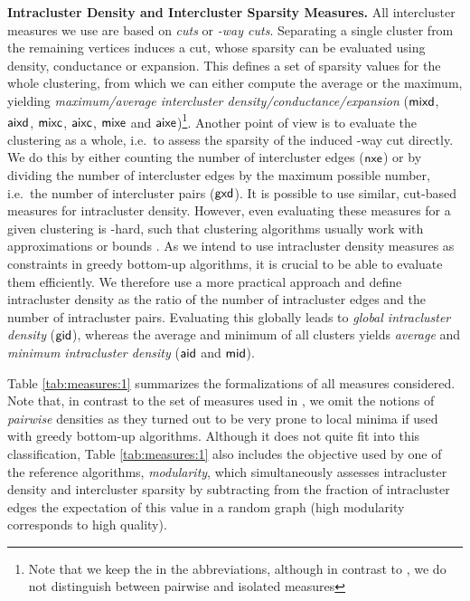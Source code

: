 \documentclass{llncs}
\newcommand{\measure}[1]{\ensuremath{\text{\normalfont{\sffamily {#1}}}}\xspace}
\newcommand{\andreapar}{\vspace*{.5ex}\par\noindent}
\begin{document}
\andreapar\textbf{Intracluster Density and Intercluster Sparsity Measures.}
All intercluster measures we use are based on \emph{cuts} or \emph{-way cuts}. 
Separating a single cluster from the remaining vertices induces a cut, 
whose sparsity can be evaluated using density, conductance or expansion.
This defines a set of sparsity values for the whole clustering, from which we can either compute the average or the maximum, yielding \emph{maximum/average intercluster density/conductance/expansion} (\measure{mixd}, \measure{aixd}, \measure{mixc}, \measure{aixc}, \measure{mixe} and \measure{aixe})\footnote{Note that we keep the  in the abbreviations, although in contrast to \cite{gsw-dcgc-11b}, we do not distinguish between pairwise and isolated measures}.
Another point of view is to evaluate the clustering as a whole, i.e.~to assess the sparsity of the induced -way cut directly.
We do this by either counting the number of intercluster edges (\measure{nxe}) or by dividing the number of intercluster edges by the maximum possible number, i.e.~the number of intercluster pairs (\measure{gxd}).
It is possible to use similar, cut-based measures for intracluster density. 
However, even evaluating these measures for a given clustering is -hard, such that clustering algorithms usually work with approximations or bounds \cite{kvv-cgds-00,ftt-gcmct-04,bgw-egcme-07}.
As we intend to use intracluster density measures as constraints in greedy bottom-up algorithms, it is crucial to be able to evaluate them efficiently. 
We therefore use a more practical approach and define intracluster density as the ratio of the number of intracluster edges and the number of intracluster pairs. 
Evaluating this globally leads to \emph{global intracluster density} (\measure{gid}), whereas the average and minimum of all clusters yields \emph{average} and \emph{minimum intracluster density} (\measure{aid} and \measure{mid}).
\par
Table \ref{tab:measures:1} summarizes the formalizations of all 
measures considered.
Note that, in contrast to the set of measures used in \cite{gsw-dcgc-11b}, we omit the notions of \emph{pairwise} densities as they turned out to be very prone to local minima if used with greedy bottom-up algorithms.
Although it does not quite fit into this classification, Table \ref{tab:measures:1} also includes the objective used by one of the reference algorithms, \emph{modularity}, which simultaneously assesses intracluster density and intercluster sparsity by subtracting from the fraction of intracluster edges the expectation of this value in a random graph (high modularity corresponds to high quality).
\end{document}
